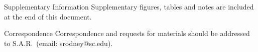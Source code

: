 \documentclass{nature_arxiv}
\begin{document}
\maketitle

\vspace{10pt}

\vspace{10pt}

\makeaffil













\clearpage
\begin{methods}
 
 
 
 
 
 
 
 
 
 
 
\end{methods}



\begin{addendum}
 \item[Supplementary Information] Supplementary figures, tables and notes are included at the end of this document.
 \item 
 \item[Correspondence] Correspondence and requests for materials
should be addressed to S.A.R.~(email: srodney@sc.edu).
\end{addendum}


\clearpage
\begin{supplementary}

\end{supplementary}


\end{document}
